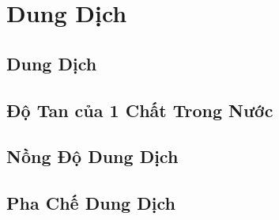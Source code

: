 \documentclass{article}
\numberwithin{equation}{section}
\begin{document}

\section{Dung Dịch}

\subsection{Dung Dịch}


\subsection{Độ Tan của 1 Chất Trong Nước}


\subsection{Nồng Độ Dung Dịch}


\subsection{Pha Chế Dung Dịch}


\printbibliography[heading=bibintoc]
	
\end{document}
